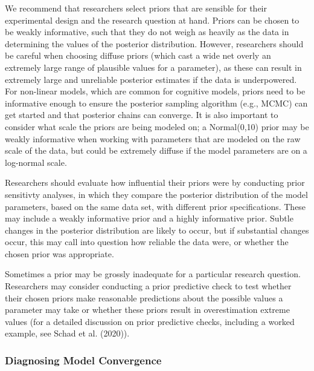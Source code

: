\documentclass[
  english,
  ,man,floatsintext]{apa6}
\begin{document}
We recommend that researchers select priors that are sensible for their experimental design and the research question at hand. Priors can be chosen to be weakly informative, such that they do not weigh as heavily as the data in determining the values of the posterior distribution. However, researchers should be careful when choosing diffuse priors (which cast a wide net overly an extremely large range of plausible values for a parameter), as these can result in extremely large and unreliable posterior estimates if the data is underpowered. For non-linear models, which are common for cognitive models, priors need to be informative enough to ensure the posterior sampling algorithm (e.g., MCMC) can get started and that posterior chains can converge. It is also important to consider what scale the priors are being modeled on; a Normal(0,10) prior may be weakly informative when working with parameters that are modeled on the raw scale of the data, but could be extremely diffuse if the model parameters are on a log-normal scale.

Researchers should evaluate how influential their priors were by conducting prior sensitivty analyses, in which they compare the posterior distribution of the model parameters, based on the same data set, with different prior specifications. These may include a weakly informative prior and a highly informative prior. Subtle changes in the posterior distribution are likely to occur, but if substantial changes occur, this may call into question how reliable the data were, or whether the chosen prior was appropriate.

Sometimes a prior may be grossly inadequate for a particular research question. Researchers may consider conducting a prior predictive check to test whether their chosen priors make reasonable predictions about the possible values a parameter may take or whether these priors result in overestimation extreme values (for a detailed discussion on prior predictive checks, including a worked example, see Schad et al. (2020)).

\hypertarget{diagnosing-model-convergence}{%
\subsubsection{Diagnosing Model Convergence}\label{diagnosing-model-convergence}}
\end{document}
